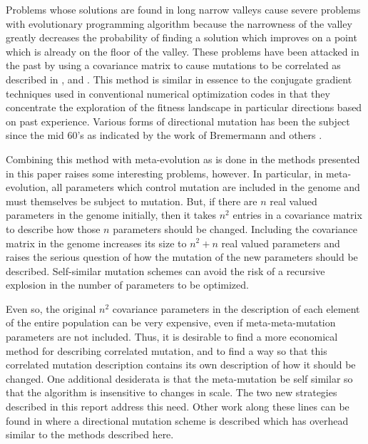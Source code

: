 \documentclass[12pt, titlepage]{article}
\begin{document}
Problems whose solutions are found in long narrow valleys cause severe
problems with evolutionary programming algorithm because the
narrowness of the valley greatly decreases the probability of finding
a solution which improves on a point which is already on the floor of
the valley.  These problems have been attacked in the past by using a
covariance matrix to cause mutations to be correlated as described in
\cite{sebald}, \cite{schwefel} and \cite{fogel92}.  This method is
similar in essence to the conjugate gradient techniques used in
conventional numerical optimization codes in that they concentrate the
exploration of the fitness landscape in particular directions based on
past experience.  Various forms of directional mutation has been the
subject since the mid 60's as indicated by the work of Bremermann and
others \cite{bremermann64,bremermann65}.

Combining this method with meta-evolution as is done in the methods
presented in this paper raises some interesting problems, however.  In
particular, in meta-evolution, all parameters which control mutation
are included in the genome and must themselves be subject to mutation.
But, if there are $n$ real valued parameters in the genome initially,
then it takes $n^2$ entries in a covariance matrix to describe how
those $n$ parameters should be changed.  Including the covariance
matrix in the genome increases its size to $n^2+n$ real valued
parameters and raises the serious question of how the mutation of the
new parameters should be described.  Self-similar mutation schemes can
avoid the risk of a recursive explosion in the number of parameters to
be optimized.

Even so, the original $n^2$ covariance parameters in the description
of each element of the entire population can be very expensive, even
if meta-meta-mutation parameters are not included.  Thus, it is
desirable to find a more economical method for describing correlated
mutation, and to find a way so that this correlated mutation
description contains its own description of how it should be changed.
One additional desiderata is that the meta-mutation be self similar so
that the algorithm is insensitive to changes in scale.  The two new
strategies described in this report address this need.  Other work
along these lines can be found in \cite{fogel97} where a directional
mutation scheme is described which has overhead similar to the methods
described here.
\end{document}
